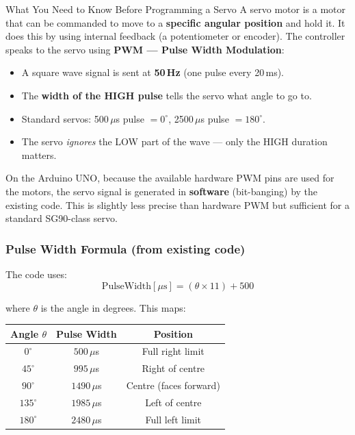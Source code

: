 \documentclass[12pt,a4paper]{article}
\begin{document}
\begin{conceptbox}{What You Need to Know Before Programming a Servo}
A servo motor is a motor that can be commanded to move to a \textbf{specific
angular position} and hold it. It does this by using internal feedback (a
potentiometer or encoder). The controller speaks to the servo using
\textbf{PWM --- Pulse Width Modulation}:

\begin{itemize}[leftmargin=1.5em]
  \item A square wave signal is sent at \textbf{50\,Hz} (one pulse every 20\,ms).
  \item The \textbf{width of the HIGH pulse} tells the servo what angle to go to.
  \item Standard servos: 500\,$\mu$s pulse $= 0^\circ$, 2500\,$\mu$s pulse $= 180^\circ$.
  \item The servo \emph{ignores} the LOW part of the wave --- only the HIGH duration matters.
\end{itemize}

On the Arduino UNO, because the available hardware PWM pins are used for the
motors, the servo signal is generated in \textbf{software} (bit-banging) by the
existing code. This is slightly less precise than hardware PWM but sufficient for
a standard SG90-class servo.
\end{conceptbox}

\subsubsection{Pulse Width Formula (from existing code)}

The code uses:
\[
  \text{PulseWidth} [\mu\text{s}] = (\theta \times 11) + 500
\]

where $\theta$ is the angle in degrees. This maps:

\begin{center}
\renewcommand{\arraystretch}{1.2}
\begin{tabular}{ccc}
\toprule
\textbf{Angle} $\theta$ & \textbf{Pulse Width} & \textbf{Position} \\
\midrule
$0^\circ$   & $500\,\mu$s  & Full right limit \\
$45^\circ$  & $995\,\mu$s  & Right of centre \\
$90^\circ$  & $1490\,\mu$s & Centre (faces forward) \\
$135^\circ$ & $1985\,\mu$s & Left of centre \\
$180^\circ$ & $2480\,\mu$s & Full left limit \\
\bottomrule
\end{tabular}
\end{center}
\end{document}
